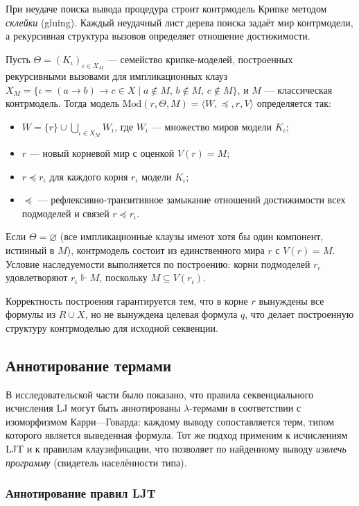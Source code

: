 \documentclass[14pt, russian]{scrartcl}
\begin{document}
При неудаче поиска вывода процедура строит контрмодель Крипке методом
\emph{склейки} (gluing). Каждый неудачный лист дерева поиска задаёт мир
контрмодели, а рекурсивная структура вызовов определяет отношение достижимости.

Пусть $\Theta = (K_\iota)_{\iota \in X_M}$ --- семейство крипке-моделей,
построенных рекурсивными вызовами для импликационных клауз
$X_M = \{\iota = (a \rightarrow b) \rightarrow c \in X \mid a \notin M,\, b \notin M,\, c \notin M\}$,
и $M$ --- классическая контрмодель. Тогда модель
$\mathrm{Mod}(r, \Theta, M) = \langle W, {\preceq}, r, V \rangle$ определяется
так:
\begin{itemize}
\item $W = \{r\} \cup \bigcup_{\iota \in X_M} W_\iota$, где $W_\iota$ ---
  множество миров модели $K_\iota$;
\item $r$ --- новый корневой мир с оценкой $V(r) = M$;
\item $r \preceq r_\iota$ для каждого корня $r_\iota$ модели $K_\iota$;
\item ${\preceq}$ --- рефлексивно-транзитивное замыкание отношений достижимости
  всех подмоделей и связей $r \preceq r_\iota$.
\end{itemize}

Если $\Theta = \varnothing$ (все импликационные клаузы имеют хотя бы один
компонент, истинный в $M$), контрмодель состоит из единственного мира $r$ с
$V(r) = M$. Условие наследуемости выполняется по построению: корни подмоделей
$r_\iota$ удовлетворяют $r_\iota \Vdash M$, поскольку $M \subseteq V(r_\iota)$.

Корректность построения гарантируется тем, что в корне $r$ вынуждены все формулы
из $R \cup X$, но не вынуждена целевая формула $q$, что делает построенную
структуру контрмоделью для исходной секвенции.

\subsection{Аннотирование термами}

В исследовательской части было показано, что правила секвенциального исчисления
LJ могут быть аннотированы $\lambda$-термами в соответствии с изоморфизмом
Карри---Говарда: каждому выводу сопоставляется терм, типом которого является
выведенная формула. Тот же подход применим к исчислениям LJT и к правилам
клаузификации, что позволяет по найденному выводу \emph{извлечь программу}
(свидетель населённости типа).

\subsubsection{Аннотирование правил LJT}
\end{document}
